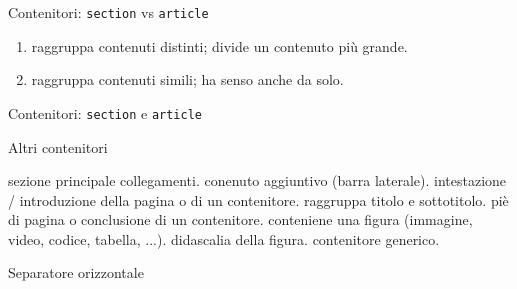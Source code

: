 \begin{frame}{Contenitori: \texttt{section} vs \texttt{article}}\transfade\centering
  \begin{enumerate}[<+->]
    \item {} raggruppa contenuti distinti; divide un contenuto più grande.
    \item {} raggruppa contenuti simili; ha senso anche da solo.
  \end{enumerate}
\end{frame}

\begin{frame}[fragile]{Contenitori: \texttt{section} e \texttt{article}}\transfade\centering
\end{frame}

\begin{frame}{Altri contenitori}\transfade\centering
  \begin{description}[<+->]
    \itemtt[nav] sezione principale collegamenti.
    \itemtt[aside] conenuto aggiuntivo (barra laterale).
    \itemtt[header] intestazione / introduzione della pagina o di un contenitore.
    \itemtt[hgroup] raggruppa titolo e sottotitolo.
    \itemtt[footer] piè di pagina o conclusione di un contenitore.
    \itemtt[figure] conteniene una figura (immagine, video, codice, tabella, ...).
    \itemtt[figcaption] didascalia della figura.
    \itemtt[div] contenitore generico.
  \end{description}
\end{frame}

\begin{frame}[fragile]{Separatore orizzontale}\transfade\centering
\end{frame}

